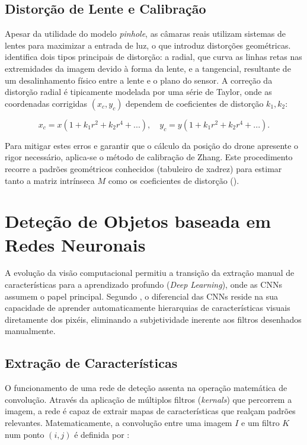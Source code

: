 \subsection{Distorção de Lente e Calibração} 

Apesar da utilidade do modelo \emph{pinhole}, as câmaras reais utilizam sistemas de lentes para maximizar a entrada de luz, o que introduz distorções geométricas. \cite{OpenCV} identifica dois tipos principais de distorção: a radial, que curva as linhas retas nas extremidades da imagem devido à forma da lente, e a tangencial, resultante de um desalinhamento físico entre a lente e o plano do sensor. A correção da distorção radial é tipicamente modelada por uma série de Taylor, onde as coordenadas corrigidas $(x_c, y_c)$ dependem de coeficientes de distorção $k_1, k_2$:

\begin{equation}
    x_c = x(1 + k_1 r^2 + k_2 r^4 + ...), \quad y_c = y(1 + k_1 r^2 + k_2 r^4 + ...).
\end{equation}

Para mitigar estes erros e garantir que o cálculo da posição do drone apresente o rigor necessário, aplica-se o método de calibração de Zhang. Este procedimento recorre a padrões geométricos conhecidos (tabuleiro de xadrez) para estimar tanto a matriz intrínseca $M$ como os coeficientes de distorção (\cite{OpenCV}).




\section{Deteção de Objetos baseada em Redes Neuronais}

A evolução da visão computacional permitiu a transição da extração manual de características para a aprendizado profundo (\emph{Deep Learning}), onde as CNNs assumem o papel principal. Segundo \cite{szeliski2022}, o diferencial das CNNs reside na sua capacidade de aprender automaticamente hierarquias de características visuais diretamente dos pixéis, eliminando a subjetividade inerente aos filtros desenhados manualmente.

\subsection{Extração de Características}

O funcionamento de uma rede de deteção assenta na operação matemática de convolução. Através da aplicação de múltiplos filtros (\emph{kernals}) que percorrem a imagem, a rede é capaz de extrair mapas de características que realçam padrões relevantes. Matematicamente, a convolução entre uma imagem $I$ e um filtro $K$ num ponto $(i, j)$ é definida por \cite{szeliski2022}:

